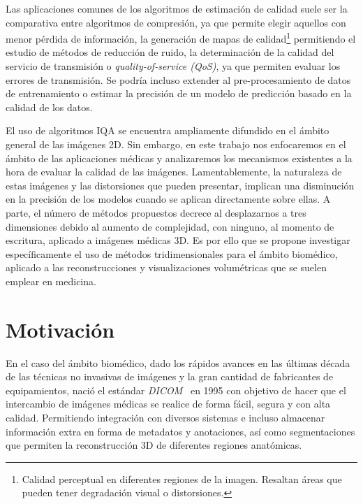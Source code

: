 Las aplicaciones comunes de los algoritmos de estimación de calidad suele ser 
la comparativa entre algoritmos de compresión, ya que permite elegir aquellos con 
menor pérdida de información, la generación de mapas de calidad\footnote{
  Calidad perceptual en diferentes regiones de la imagen. Resaltan áreas que 
  pueden tener degradación visual o distorsiones.
}
permitiendo el estudio de métodos de reducción de ruido,
la determinación de la calidad del servicio de transmisión o \emph{quality-of-service (QoS)},
ya que permiten evaluar los errores de transmisión\cite{VMAF, VMAFReproducibility}. Se podría incluso 
extender al pre-procesamiento de datos de entrenamiento o estimar la precisión 
de un modelo de predicción basado en la calidad de los datos\cite{ApplicationsOfIQA}.

El uso de algoritmos IQA se encuentra ampliamente difundido en el ámbito general de las imágenes 2D. Sin embargo, en este trabajo nos enfocaremos en el ámbito de las aplicaciones médicas y analizaremos los mecanismos existentes a la hora de evaluar la calidad de las imágenes. 
Lamentablemente, la naturaleza de estas imágenes y las distorsiones que 
pueden presentar, implican una disminución en la precisión de los modelos 
cuando se aplican directamente sobre ellas\cite{VisualMedicalQualityBook}.
A parte, el número de métodos propuestos decrece al desplazarnos a tres dimensiones 
debido al aumento de complejidad, con ninguno, al momento de escritura, 
aplicado a imágenes médicas 3D.
Es por ello que se propone investigar específicamente el uso de métodos tridimensionales para 
el ámbito biomédico, aplicado a las reconstrucciones y visualizaciones volumétricas 
que se suelen emplear en medicina.



\section{Motivación}
 
En el caso del ámbito biomédico, dado los rápidos avances en las últimas década
de las técnicas no invasivas de imágenes y la gran cantidad de fabricantes 
de equipamientos, nació el estándar \emph{DICOM}~\cite{Parisot1995} en 1995 
con objetivo de hacer que el intercambio de imágenes médicas se realice de forma 
fácil, segura y con alta calidad. Permitiendo integración con diversos sistemas e 
incluso almacenar información extra en forma de metadatos y anotaciones, así como segmentaciones que permiten la reconstrucción 3D de diferentes regiones anatómicas.


